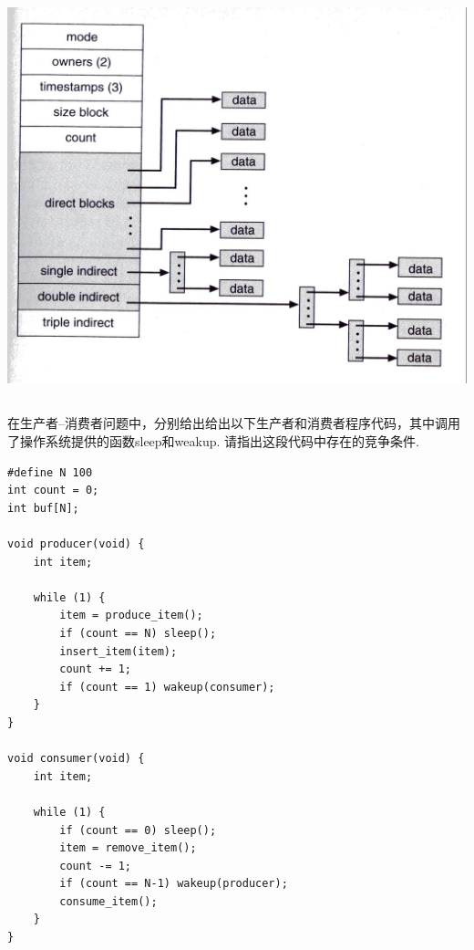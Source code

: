 \documentclass[a4paper,11pt]{article}
\begin{document}
\begin{CJK*}{UTF8}{gbsn}
%
\includegraphics{inode-detail.jpg}

\newpage
\subsection{}
在生产者--消费者问题中，分别给出给出以下生产者和消费者程序代码，其中调用了操作系统提供的函数sleep和weakup.
请指出这段代码中存在的竞争条件.

%
\begin{verbatim}
#define N 100
int count = 0;
int buf[N];

void producer(void) {
    int item;

    while (1) {
        item = produce_item();
        if (count == N) sleep();
        insert_item(item);
        count += 1;
        if (count == 1) wakeup(consumer);
    }
}

void consumer(void) {
    int item;

    while (1) {
        if (count == 0) sleep();
        item = remove_item();
        count -= 1;
        if (count == N-1) wakeup(producer);
        consume_item();
    }
}
\end{verbatim}



\end{CJK*}
\end{document}
